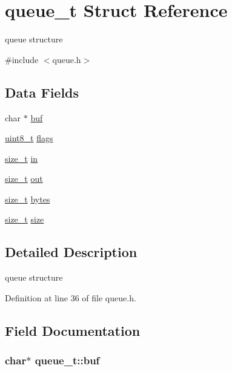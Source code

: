 \hypertarget{structqueue__t}{}\section{queue\+\_\+t Struct Reference}
\label{structqueue__t}


queue structure  




{\ttfamily \#include $<$queue.\+h$>$}

\subsection*{Data Fields}
\begin{DoxyCompactItemize}
\item 
char $\ast$ \hyperlink{structqueue__t_aaee81421d150a17123a2b858d5b1685d}{buf}
\item 
\hyperlink{send_8c_aba7bc1797add20fe3efdf37ced1182c5}{uint8\+\_\+t} \hyperlink{structqueue__t_a2a516773a572c746d461c9df3cb30387}{flags}
\item 
\hyperlink{cpu_8h_aea0c7eab1ce1eebb4e879ef4e23c16ee}{size\+\_\+t} \hyperlink{structqueue__t_a7a6832e36c70a1db7fddc93fb6be9d63}{in}
\item 
\hyperlink{cpu_8h_aea0c7eab1ce1eebb4e879ef4e23c16ee}{size\+\_\+t} \hyperlink{structqueue__t_a8f6e1c623d2ceed398a71a0aab93b0fa}{out}
\item 
\hyperlink{cpu_8h_aea0c7eab1ce1eebb4e879ef4e23c16ee}{size\+\_\+t} \hyperlink{structqueue__t_a58398d4ee60bc90ffba2bc3488fe185b}{bytes}
\item 
\hyperlink{cpu_8h_aea0c7eab1ce1eebb4e879ef4e23c16ee}{size\+\_\+t} \hyperlink{structqueue__t_a83a13b888f9d4ef127d706559818b779}{size}
\end{DoxyCompactItemize}


\subsection{Detailed Description}
queue structure 

Definition at line 36 of file queue.\+h.



\subsection{Field Documentation}
\subsubsection[{\texorpdfstring{buf}{buf}}]{\setlength{\rightskip}{0pt plus 5cm}char$\ast$ queue\+\_\+t\+::buf}\hypertarget{structqueue__t_aaee81421d150a17123a2b858d5b1685d}{}\label{structqueue__t_aaee81421d150a17123a2b858d5b1685d}


